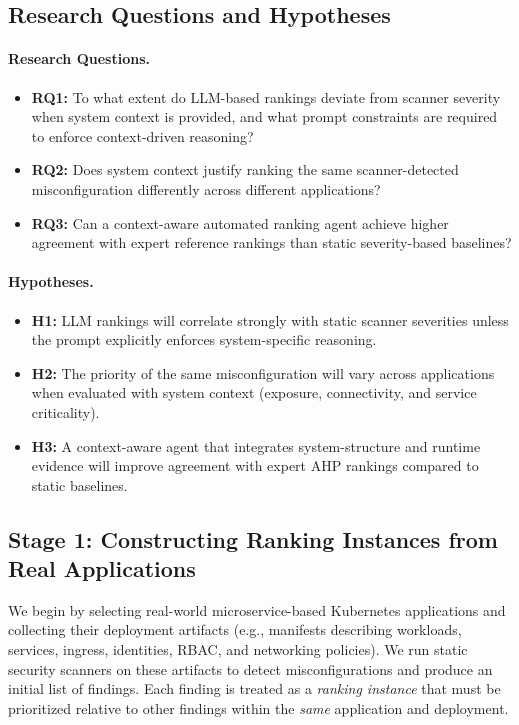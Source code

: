 \documentclass[12pt]{article}
\begin{document}
\subsection{Research Questions and Hypotheses}
\label{subsec:rqs_hypotheses}

\paragraph{Research Questions.}
\begin{itemize}
    \item \textbf{RQ1:} To what extent do LLM-based rankings deviate from scanner severity when system context is provided, and what prompt constraints are required to enforce context-driven reasoning?

    \item \textbf{RQ2:} Does system context justify ranking the same scanner-detected misconfiguration differently across different applications?
    \item \textbf{RQ3:} Can a context-aware automated ranking agent achieve higher agreement with expert reference rankings than static severity-based baselines?
\end{itemize}

\paragraph{Hypotheses.}
\begin{itemize}
    \item \textbf{H1:} LLM rankings will correlate strongly with static scanner severities unless the prompt explicitly enforces system-specific reasoning.
    \item \textbf{H2:} The priority of the same misconfiguration will vary across applications when evaluated with system context (exposure, connectivity, and service criticality).
    \item \textbf{H3:} A context-aware agent that integrates system-structure and runtime evidence will improve agreement with expert AHP rankings compared to static baselines.
\end{itemize}

\subsection{Stage 1: Constructing Ranking Instances from Real Applications}
\label{subsec:stage1}

We begin by selecting real-world microservice-based Kubernetes applications and collecting their deployment artifacts (e.g., manifests describing workloads, services, ingress, identities, RBAC, and networking policies). We run static security scanners on these artifacts to detect misconfigurations and produce an initial list of findings. Each finding is treated as a \emph{ranking instance} that must be prioritized relative to other findings within the \emph{same} application and deployment.
\end{document}
